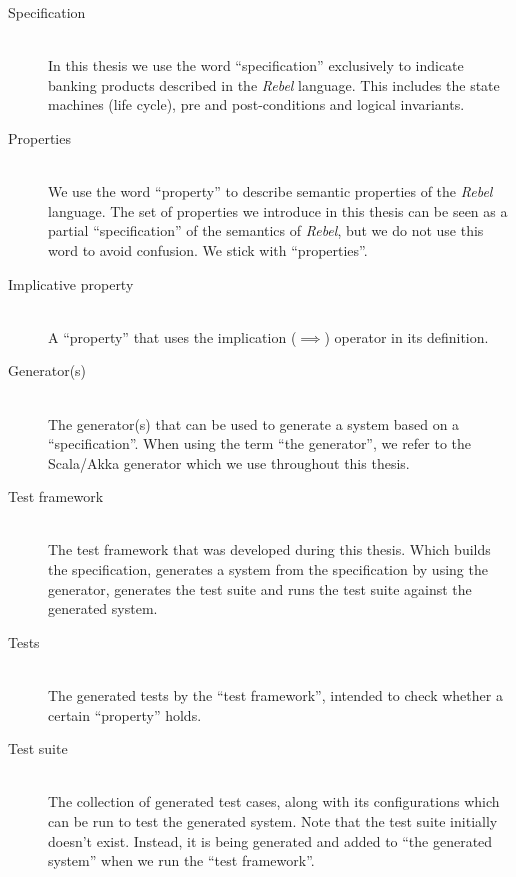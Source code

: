 \begin{description}
\item[Specification]\hfill\\
In this thesis we use the word ``specification'' exclusively to indicate
banking products described in the \textit{Rebel} language. This includes the
state machines (life cycle), pre and post-conditions and logical invariants.

\item[Properties]\hfill\\
We use the word ``property'' to describe semantic properties of the
\textit{Rebel} language. The set of properties we introduce in this thesis can
be seen as a partial ``specification'' of the semantics of \textit{Rebel}, but
we do not use this word to avoid confusion. We stick with ``properties''.

\item[Implicative property]\hfill\\
A ``property'' that uses the implication ($\implies$) operator in its
definition.

\item[Generator(s)]\hfill\\
The generator(s) that can be used to generate a system based on a
``specification''. When using the term ``the generator'', we refer to the
Scala/Akka generator which we use throughout this thesis.

\item[Test framework]\hfill\\
The test framework that was developed during this thesis. Which builds the
specification, generates a system from the specification by using the generator,
generates the test suite and runs the test suite against the generated system.


\item[Tests]\hfill\\
The generated tests by the ``test framework'', intended to check whether a
certain ``property'' holds.

\item[Test suite]\hfill\\
The collection of generated test cases, along with its configurations which can
be run to test the generated system. Note that the test suite initially doesn't
exist. Instead, it is being generated and added to ``the generated system'' when
we run the ``test framework''.


\end{description}

